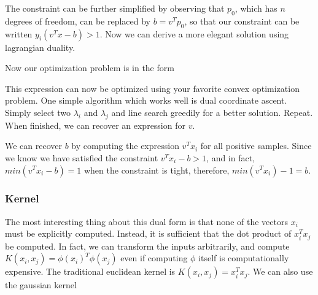\documentclass[12pt]{article}
\begin{document}
The constraint can be further simplified by observing that $p_0$, which has $n$ degrees of freedom, can be replaced by $b = v^Tp_0$, so that our constraint can be written $y_i (v^Tx - b) > 1$. Now we can derive a more elegant solution using lagrangian duality. 


Now our optimization problem is in the form

This expression can now be optimized using your favorite convex optimization problem. One simple algorithm which works well is dual coordinate ascent. Simply select two $\lambda_i$ and $\lambda_j$ and line search greedily for a better solution. Repeat. When finished, we can recover an expression for $v$.

We can recover $b$ by computing the expression $v^Tx_i$ for all positive samples. Since we know we have satisfied the constraint $v^Tx_i - b > 1$, and in fact, $min(v^Tx_i -b) = 1$ when the constraint is tight, therefore, $min(v^Tx_i)-1 = b$. 

\subsubsection{Kernel}

The most interesting thing about this dual form is that none of the vectors $x_i$ must be explicitly computed. Instead, it is sufficient that the dot product of $x_i^T x_j$ be computed. In fact, we can transform the inputs arbitrarily, and compute $K(x_i, x_j) = \phi(x_i)^T \phi(x_j)$ even if computing $\phi$ itself is computationally expensive. The traditional euclidean kernel is $K(x_i, x_j) = x_i^Tx_j$. We can also use the gaussian kernel
\end{document}
